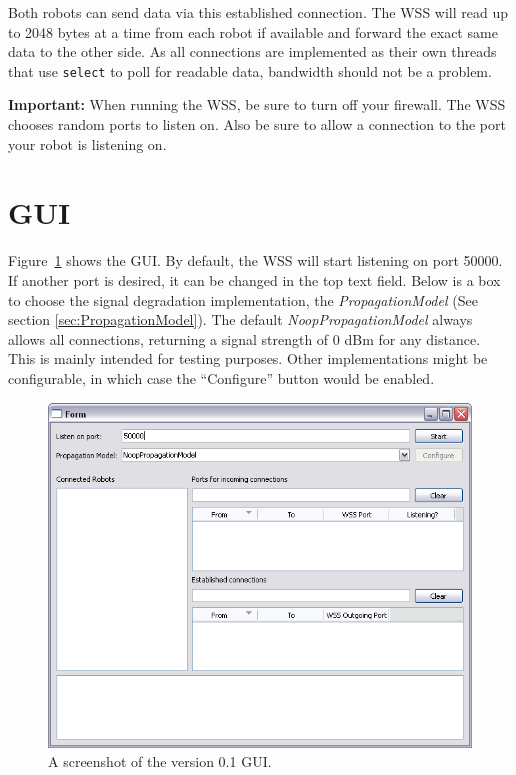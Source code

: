 \documentclass[11pt,a4paper]{article}
\begin{document}
Both robots can send data via this established connection. The WSS will read up to 2048 bytes at a time from each robot if available and forward the exact same data to the other side. As all connections are implemented as their own threads that use \texttt{select} to poll for readable data, bandwidth should not be a problem.

\textbf{Important:} When running the WSS, be sure to turn off your firewall. The WSS chooses random ports to listen on. Also be sure to allow a connection to the port your robot is listening on.

\section{GUI}

Figure~\ref{fig:screenshot} shows the GUI. By default, the WSS will start listening on port 50000. If another port is desired, it can be changed in the top text field. Below is a box to choose the signal degradation implementation, the \emph{PropagationModel} (See section \ref{sec:PropagationModel}). The default \emph{NoopPropagationModel} always allows all connections, returning a signal strength of 0 dBm for any distance. This is mainly intended for testing purposes. Other implementations might be configurable, in which case the ``Configure'' button would be enabled.

\begin{figure}[htb]
	\centering
	\includegraphics[width=.9\textwidth]{WSS-GUI.png}
	\caption{A screenshot of the version 0.1 GUI.}
	\label{fig:screenshot}
\end{figure}
\end{document}

